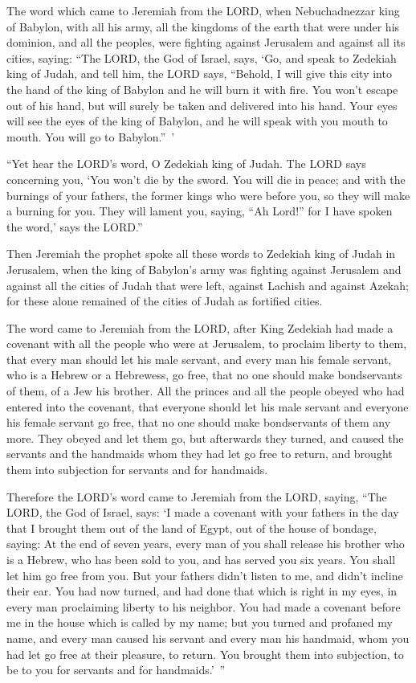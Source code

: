 \mychapter{} \myverse*{}The word which came to Jeremiah from the LORD, when Nebuchadnezzar king of Babylon, with all his army, all the kingdoms of the earth that were under his dominion, and all the peoples, were fighting against Jerusalem and against all its cities, saying: \myverse{}“The LORD, the God of Israel, says, ‘Go, and speak to Zedekiah king of Judah, and tell him, the LORD says, “Behold, I will give this city into the hand of the king of Babylon and he will burn it with fire. \myverse{}You won’t escape out of his hand, but will surely be taken and delivered into his hand. Your eyes will see the eyes of the king of Babylon, and he will speak with you mouth to mouth. You will go to Babylon.” ’


\myverse{}“Yet hear the LORD’s word, O Zedekiah king of Judah. The LORD says concerning you, ‘You won’t die by the sword. \myverse{}You will die in peace; and with the burnings of your fathers, the former kings who were before you, so they will make a burning for you. They will lament you, saying, “Ah Lord!” for I have spoken the word,’ says the LORD.”


\myverse{}Then Jeremiah the prophet spoke all these words to Zedekiah king
of Judah in Jerusalem, \myverse{}when the king of Babylon’s army was fighting against Jerusalem and against all the cities of Judah that were left, against Lachish and against Azekah; for these alone remained of the cities of Judah as fortified cities.


\myverse{}The word came to Jeremiah from the LORD, after King Zedekiah had made a covenant with all the people who were at Jerusalem, to proclaim liberty to them, \myverse{}that every man should let his male servant, and every man his female servant, who is a Hebrew or a Hebrewess, go free, that no one should make bondservants of them, of a Jew his brother. \myverse{}All the princes and all the people obeyed who had entered into the covenant, that everyone should let his male servant and everyone his female servant go free, that no one should make bondservants of them any more. They obeyed and let them go, \myverse{}but afterwards they turned, and caused the servants and the handmaids whom they had let go free to return, and brought them into subjection for servants and for handmaids.


\myverse{}Therefore the LORD’s word came to Jeremiah from the LORD, saying, \myverse{}“The LORD, the God of Israel, says: ‘I made a covenant with your fathers in the day that I brought them out of the land of Egypt, out of the house of bondage, saying: \myverse{}At the end of seven years, every man of you shall release his brother who is a Hebrew, who has been sold to you, and has served you six years. You shall let him go free from you. But your fathers didn’t listen to me, and didn’t incline their ear. \myverse{}You had now turned, and had done that which is right in my eyes, in every man proclaiming liberty to his neighbor. You had made a covenant before me in the house which is called by my name; \myverse{}but you turned and profaned my name, and every man caused his servant and every man his handmaid, whom you had let go free at their pleasure, to return. You brought them into subjection, to be to you for servants and for handmaids.’ ”


